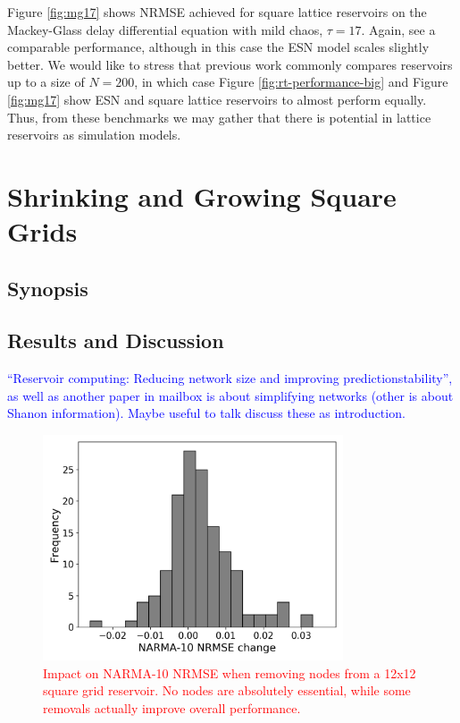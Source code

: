 Figure \ref{fig:mg17} shows NRMSE achieved for square lattice reservoirs on the
Mackey-Glass delay differential equation with mild chaos, $\tau = 17$. Again,
see a comparable performance, although in this case the ESN model scales
slightly better. We would like to stress that previous work commonly compares
reservoirs up to a size of $N = 200$, in which case Figure
\ref{fig:rt-performance-big} and Figure \ref{fig:mg17} show ESN and square
lattice reservoirs to almost perform equally. Thus, from these benchmarks we may
gather that there is potential in lattice reservoirs as simulation models.

\section{Shrinking and Growing Square Grids}
\label{sec:shrink-grow}

\subsection{Synopsis}

\subsection{Results and Discussion}

\textcolor{blue}{
  ``Reservoir computing: Reducing network size and improving
predictionstability'', as well as another paper in mailbox is about simplifying
networks (other is about Shanon information). Maybe useful to talk discuss these
as introduction.
}

\begin{figure}
  \centering
  \includegraphics[width=3.5in]{figures/removal-hist.png}
  \caption{
    \textcolor{red}{
      Impact on NARMA-10 NRMSE when removing nodes from a 12x12 square grid
reservoir. No nodes are absolutely essential, while some removals actually
improve overall performance.
    }
  }
  \label{fig:rt-removal-hist}
\end{figure}


